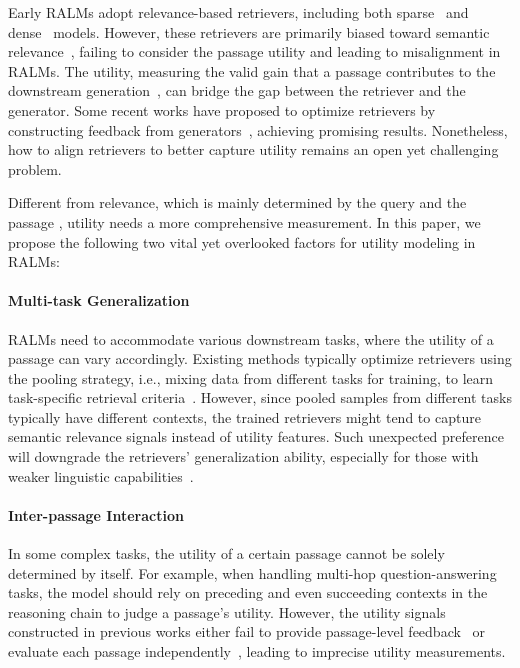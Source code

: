 \documentclass[11pt]{article}
\begin{document}
Early RALMs adopt relevance-based retrievers, including both sparse~\citep{bm25} and dense~\citep{dpr} models. However, these retrievers are primarily biased toward semantic relevance~\citep{wu2024easilyirrelevantinputsskew}, failing to consider the passage utility and leading to misalignment in RALMs. The utility, measuring the valid gain that a passage contributes to the downstream generation~\citep{arellmgoodatutilityjudgements}, can bridge the gap between the retriever and the generator. Some recent works have proposed to optimize retrievers by constructing feedback from generators~\citep{replug, aar, wei2024instructrag}, achieving promising results. Nonetheless, how to align retrievers to better capture utility remains an open yet challenging problem.



Different from relevance, which is mainly determined by the query and the passage \citep{learningmaximalmarginal, matchzoo}, utility needs a more comprehensive measurement. In this paper, we propose the following two vital yet overlooked factors for utility modeling in RALMs:



\paragraph{Multi-task Generalization} RALMs need to accommodate various downstream tasks, where the utility of a passage can vary accordingly. Existing methods typically optimize retrievers using the pooling strategy, i.e., mixing data from different tasks for training, to learn task-specific retrieval criteria~\citep{lin2024raditretrievalaugmenteddualinstruction, stochasticrag}. However, since pooled samples from different tasks typically have different contexts, the trained retrievers might tend to capture semantic relevance signals instead of utility features. Such unexpected preference will downgrade the retrievers' generalization ability, especially for those with weaker linguistic capabilities~\citep{liu2024finegrainedguidanceretrieversleveraging}.



\paragraph{Inter-passage Interaction} In some complex tasks, the utility of a certain passage cannot be solely determined by itself. For example, when handling multi-hop question-answering tasks, the model should rely on preceding and even succeeding contexts in the reasoning chain to judge a passage's utility. However, the utility signals constructed in previous works either fail to provide passage-level feedback~\citep{stochasticrag, sohn2024rationaleguidedretrievalaugmentedgeneration} or evaluate each passage independently~\citep{aar, replug}, leading to imprecise utility measurements.
\end{document}
